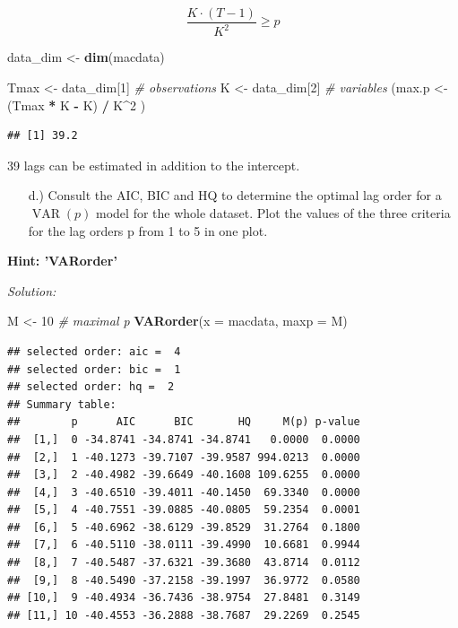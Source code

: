 \documentclass[12pt,a4paper]{article}
\newcommand{\VAR}{\operatorname{VAR}} %
\newenvironment{Shaded}{\begin{snugshade}}{\end{snugshade}}
\newcommand{\CommentTok}[1]{\textcolor[rgb]{0.56,0.35,0.01}{\textit{#1}}}
\newcommand{\DataTypeTok}[1]{\textcolor[rgb]{0.13,0.29,0.53}{#1}}
\newcommand{\DecValTok}[1]{\textcolor[rgb]{0.00,0.00,0.81}{#1}}
\newcommand{\KeywordTok}[1]{\textcolor[rgb]{0.13,0.29,0.53}{\textbf{#1}}}
\newcommand{\NormalTok}[1]{#1}
\newcommand{\OperatorTok}[1]{\textcolor[rgb]{0.81,0.36,0.00}{\textbf{#1}}}
\newcommand{\StringTok}[1]{\textcolor[rgb]{0.31,0.60,0.02}{#1}}
\begin{document}
\[ \dfrac{K \cdot (T -1)}{K^2} \geq p\]

\begin{Shaded}
\begin{Highlighting}[]
\NormalTok{data_dim <-}\StringTok{ }\KeywordTok{dim}\NormalTok{(macdata) }

\NormalTok{Tmax <-}\StringTok{ }\NormalTok{data_dim[}\DecValTok{1}\NormalTok{] }\CommentTok{# observations}
\NormalTok{K <-}\StringTok{ }\NormalTok{data_dim[}\DecValTok{2}\NormalTok{] }\CommentTok{# variables}
\NormalTok{(max.p <-}\StringTok{ }\NormalTok{(Tmax }\OperatorTok{*}\StringTok{ }\NormalTok{K }\OperatorTok{-}\StringTok{ }\NormalTok{K) }\OperatorTok{/}\StringTok{ }\NormalTok{K}\OperatorTok{^}\DecValTok{2}\NormalTok{ )}
\end{Highlighting}
\end{Shaded}

\begin{verbatim}
## [1] 39.2
\end{verbatim}

39 lags can be estimated in addition to the intercept.

\begin{itemize}
  \item[d.)] Consult the AIC, BIC and HQ to determine the optimal lag order for a $\VAR(p)$ model for the whole dataset. Plot the values of the three criteria for the lag orders p from 1 to 5 in one plot.
\end{itemize}

\textbf{Hint: 'VARorder'}

\emph{Solution:}

\begin{Shaded}
\begin{Highlighting}[]
\NormalTok{M <-}\StringTok{ }\DecValTok{10} \CommentTok{# maximal p }
\KeywordTok{VARorder}\NormalTok{(}\DataTypeTok{x =}\NormalTok{ macdata, }\DataTypeTok{maxp =}\NormalTok{ M)}
\end{Highlighting}
\end{Shaded}

\begin{verbatim}
## selected order: aic =  4 
## selected order: bic =  1 
## selected order: hq =  2 
## Summary table:  
##        p      AIC      BIC       HQ     M(p) p-value
##  [1,]  0 -34.8741 -34.8741 -34.8741   0.0000  0.0000
##  [2,]  1 -40.1273 -39.7107 -39.9587 994.0213  0.0000
##  [3,]  2 -40.4982 -39.6649 -40.1608 109.6255  0.0000
##  [4,]  3 -40.6510 -39.4011 -40.1450  69.3340  0.0000
##  [5,]  4 -40.7551 -39.0885 -40.0805  59.2354  0.0001
##  [6,]  5 -40.6962 -38.6129 -39.8529  31.2764  0.1800
##  [7,]  6 -40.5110 -38.0111 -39.4990  10.6681  0.9944
##  [8,]  7 -40.5487 -37.6321 -39.3680  43.8714  0.0112
##  [9,]  8 -40.5490 -37.2158 -39.1997  36.9772  0.0580
## [10,]  9 -40.4934 -36.7436 -38.9754  27.8481  0.3149
## [11,] 10 -40.4553 -36.2888 -38.7687  29.2269  0.2545
\end{verbatim}
\end{document}
